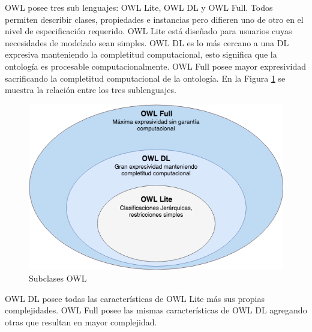OWL posee tres sub lenguajes: OWL Lite, OWL DL y OWL Full. Todos permiten describir clases, propiedades e instancias pero difieren uno de otro en el nivel de especificación requerido. OWL Lite está diseñado para usuarios cuyas necesidades de modelado sean simples. OWL DL es lo más cercano a una DL expresiva manteniendo la completitud computacional, esto significa que la ontología es procesable computacionalmente. OWL Full posee mayor expresividad sacrificando la completitud computacional de la ontología. En la Figura \ref{img:subclases owl} se muestra la relación entre los tres sublenguajes.

\begin{figure}[h!]
    \centering
    \includegraphics[width=150mm]{figuras/Diagramas-OwlSubClasses}
    \caption{Subclases OWL}
    \label{img:subclases owl}
    \end{figure}

OWL DL posee todas las características de OWL Lite más sus propias complejidades. OWL Full posee las mismas características de OWL DL agregando otras que resultan en mayor complejidad.
